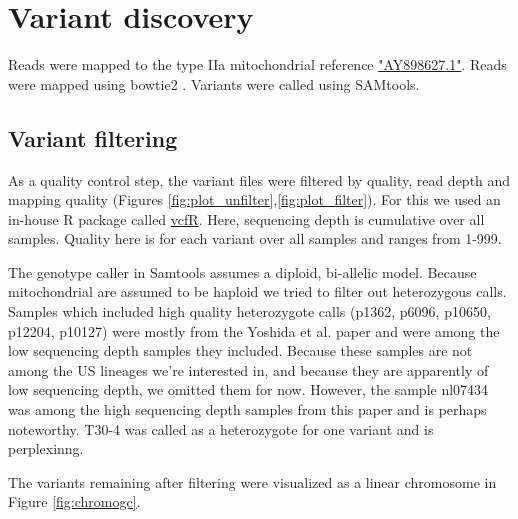 \documentclass{article}\usepackage[]{graphicx}\usepackage[]{color}
\begin{document}

\section{Variant discovery}

Reads were mapped to the type IIa mitochondrial reference \href{http://www.ncbi.nlm.nih.gov/nuccore/AY898627.1}{"AY898627.1"}.  Reads were mapped using bowtie2 \cite{langmead2012fast}.  Variants were called using SAMtools\cite{li2009sequence}.

\subsection{Variant filtering}
As a quality control step, the variant files were filtered by quality, read depth and mapping quality (Figures \ref{fig:plot_unfilter},\ref{fig:plot_filter}). For this we used an in-house R package called \href{https://github.com/knausb/vcfR}{vcfR}. Here, sequencing depth is cumulative over all samples.  Quality here is for each variant over all samples and ranges from 1-999.

The genotype caller in Samtools assumes a diploid, bi-allelic model.  Because mitochondrial are assumed to be haploid we tried to filter out heterozygous calls.  Samples which included high quality heterozygote calls (p1362, p6096, p10650, p12204, p10127) were mostly from the Yoshida et al. \cite{yoshida2013correction} paper and were among the low sequencing depth samples they included.  Because these samples are not among the US lineages we're interested in, and because they are apparently of low sequencing depth, we omitted them for now.  However, the sample nl07434 was among the high sequencing depth samples from this paper and is perhaps noteworthy.  T30-4 was called as a heterozygote for one variant and is perplexinng.

The variants remaining after filtering were visualized as a linear chromosome in Figure \ref{fig:chromogc}.
\end{document}
